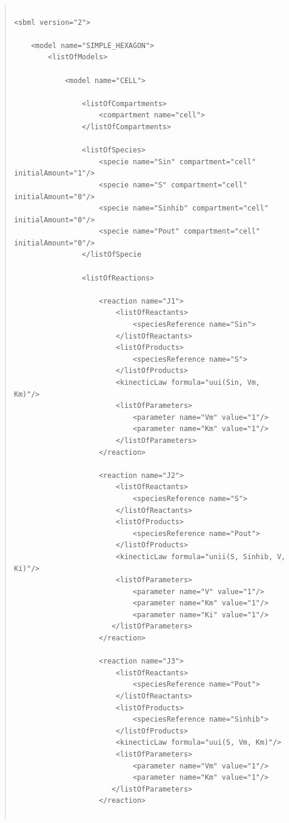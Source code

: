 \documentclass[10pt]{article}
\newcommand{\tightspacing}{\renewcommand{\baselinestretch}{0.85}}
\begin{document}
\begin{quote}
  \begin{small}
    \tightspacing
\begin{verbatim}

<sbml version="2">

    <model name="SIMPLE_HEXAGON">
        <listOfModels>

            <model name="CELL">

                <listOfCompartments>
                    <compartment name="cell">
                </listOfCompartments>

                <listOfSpecies>
                    <specie name="Sin" compartment="cell" initialAmount="1"/>
                    <specie name="S" compartment="cell" initialAmount="0"/>
                    <specie name="Sinhib" compartment="cell" initialAmount="0"/>
                    <specie name="Pout" compartment="cell" initialAmount="0"/>
                </listOfSpecie

                <listOfReactions>

                    <reaction name="J1">
                        <listOfReactants>
                            <speciesReference name="Sin">
                        </listOfReactants>
                        <listOfProducts>
                            <speciesReference name="S">
                        </listOfProducts>
                        <kinecticLaw formula="uui(Sin, Vm, Km)"/>
                        <listOfParameters>
                            <parameter name="Vm" value="1"/>
                            <parameter name="Km" value="1"/>
                        </listOfParameters>
                    </reaction>

                    <reaction name="J2">
                        <listOfReactants>
                            <speciesReference name="S">
                        </listOfReactants>
                        <listOfProducts>
                            <speciesReference name="Pout">
                        </listOfProducts>
                        <kinecticLaw formula="unii(S, Sinhib, V, Ki)"/>
                        <listOfParameters>
                            <parameter name="V" value="1"/>
                            <parameter name="Km" value="1"/>
                            <parameter name="Ki" value="1"/>
                       </listOfParameters>
                    </reaction>

                    <reaction name="J3">
                        <listOfReactants>
                            <speciesReference name="Pout">
                        </listOfReactants>
                        <listOfProducts>
                            <speciesReference name="Sinhib">
                        </listOfProducts>
                        <kinecticLaw formula="uui(S, Vm, Km)"/>
                        <listOfParameters>
                            <parameter name="Vm" value="1"/>
                            <parameter name="Km" value="1"/>
                       </listOfParameters>
                    </reaction>


\end{verbatim}
\end{small}
\end{quote}
\end{document}

